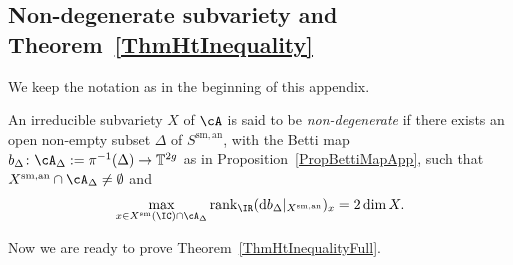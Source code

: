 \subsection{Non-degenerate subvariety and
 Theorem~\ref{ThmHtInequality}}
 We keep the notation as in the beginning of this appendix.
\begin{definition}
\notready\label{DefinitionNonDegenerateApp}
An irreducible subvariety $X$ of $\cA$ is said to be
\textit{non-degenerate} if there exists an open non-empty subset
$\Delta$ of $S^{\mathrm{sm},\mathrm{an}}$,
   with the Betti map
$b_{\Delta} \colon \cA_{\Delta}:=\pi^{-1}(\Delta) \rightarrow
\mathbb{T}^{2g}$ as in Proposition~\ref{PropBettiMapApp}, such that
$X^\mathrm{sm,an}\cap \cA_{\Delta}\not=\emptyset$ and
\[
\max_{x \in X^{\mathrm{sm}}(\IC) \cap \cA_{\Delta}} \mathrm{rank}_{\IR} (\mathrm{d}b_{\Delta}|_{X^{\mathrm{sm,an}}})_x = 2\dim X.
\]%
\end{definition}




Now we are ready to prove Theorem~\ref{ThmHtInequalityFull}.

